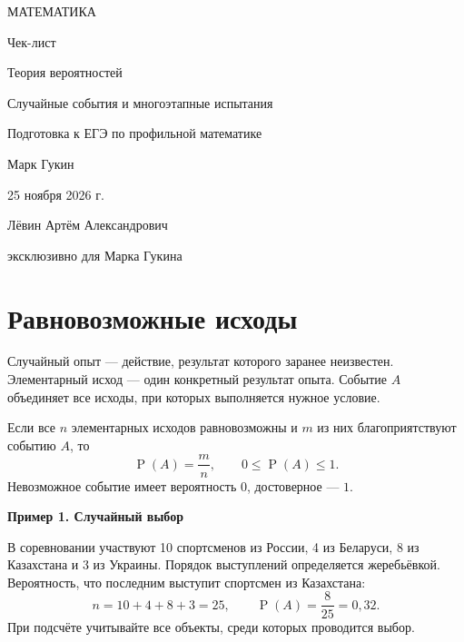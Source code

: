 \documentclass[a4paper,12pt]{article}
\newcommand{\example}[1]{\par\medskip\textcolor{darkaccent}{\textbf{#1}}\par}
\newcommand{\prob}{\mathop{\mathrm{P}}}
\begin{document}
\begin{titlepage}
\centering
\vspace*{30mm}
{\Large\color{darkaccent} МАТЕМАТИКА\par}
\vspace{16mm}
{\huge Чек-лист\par}
\vspace{10mm}
{\LARGE\color{accent} Теория вероятностей\par}
\vspace{4mm}
{\large Случайные события и многоэтапные испытания\par}
\vspace{16mm}
{\large Подготовка к ЕГЭ по профильной математике\par}
\vfill
{\large Марк Гукин\par}
\vspace{11mm}
25 ноября 2026 г.\par
\vspace{18mm}
{\small Лёвин Артём Александрович\par
эксклюзивно для Марка Гукина\par}
\vspace{18mm}
\vspace{6mm}
\end{titlepage}
\setcounter{page}{1}
\section{Равновозможные исходы}
Случайный опыт — действие, результат которого заранее неизвестен. Элементарный исход — один конкретный результат опыта. Событие $A$ объединяет все исходы, при которых выполняется нужное условие.

Если все $n$ элементарных исходов равновозможны и $m$ из них благоприятствуют событию $A$, то
\[ \prob(A)=\frac{m}{n},\qquad 0\leq \prob(A)\leq 1. \]
Невозможное событие имеет вероятность $0$, достоверное — $1$.

\example{Пример 1. Случайный выбор}
В соревновании участвуют 10 спортсменов из России, 4 из Беларуси, 8 из Казахстана и 3 из Украины. Порядок выступлений определяется жеребьёвкой. Вероятность, что последним выступит спортсмен из Казахстана:
\[ n=10+4+8+3=25,\qquad \prob(A)=\frac{8}{25}=0,32. \]
При подсчёте учитывайте все объекты, среди которых проводится выбор.
\end{document}
